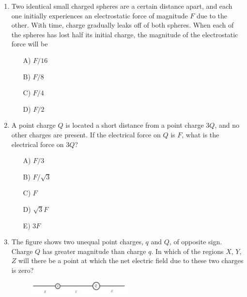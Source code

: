 \begin{enumerate}
    \item Two identical small charged spheres are a certain distance apart, and each one initially experiences an electrostatic force of magnitude $F$ due to the other. With time, charge gradually leaks off of both spheres. When each of the spheres has lost half its initial charge, the magnitude of the electrostatic force will be

\begin{multicols}{5}
    \begin{itemize}
        \item[A)] $F/16$ 
        \item[B)] $F/8$
        \item[C)] $F/4$
        \item[D)] $F/2$
    \end{itemize}
\end{multicols}
   
    

    \item A point charge $Q$ is located a short distance from a point charge $3Q$, and no other charges are present. If the electrical force on $Q$ is $F$, what is the electrical force on $3Q$?

\begin{multicols}{5}
    \begin{itemize}
        \item[A)] $F/3$ 
        \item[B)] $F/\sqrt{3}$
        \item[C)] $F$
        \item[D)] $\sqrt{3}F$
        \item[E)] $3F$ 
    \end{itemize}
\end{multicols}
    


    \item The figure shows two unequal point charges, $q$ and $Q$, of opposite sign. Charge $Q$ has greater magnitude than charge $q$. In which of the regions $X$, $Y$, $Z$ will there be a point at which the net electric field due to these two charges is zero?

    \begin{figure}[H]
        \centering
        \includegraphics[width=0.5\textwidth]{figures-workshop01/problem-3.png}
    \end{figure}


\end{enumerate}
